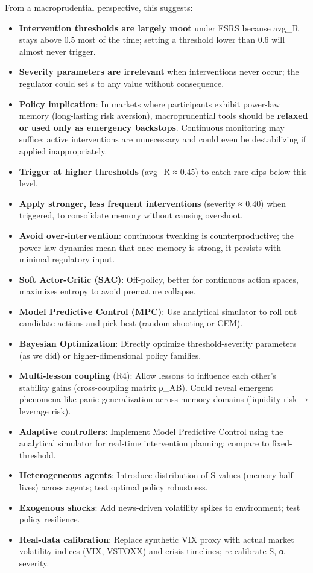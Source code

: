 \documentclass[11pt]{article}
\begin{document}
{{{From a macroprudential perspective, this suggests:
\begin{itemize}
  \item \textbf{Intervention thresholds are largely moot} under FSRS because avg\_R stays above 0.5 most of the time; setting a threshold lower than 0.6 will almost never trigger.
  \item \textbf{Severity parameters are irrelevant} when interventions never occur; the regulator could set s to any value without consequence.
  \item \textbf{Policy implication}: In markets where participants exhibit power-law memory (long-lasting risk aversion), macroprudential tools should be \textbf{relaxed or used only as emergency backstops}. Continuous monitoring may suffice; active interventions are unnecessary and could even be destabilizing if applied inappropriately.
  \item \textbf{Trigger at higher thresholds} (avg\_R ≈ 0.45) to catch rare dips below this level,
  \item \textbf{Apply stronger, less frequent interventions} (severity ≈ 0.40) when triggered, to consolidate memory without causing overshoot,
  \item \textbf{Avoid over-intervention}: continuous tweaking is counterproductive; the power-law dynamics mean that once memory is strong, it persists with minimal regulatory input.
  \item \textbf{Soft Actor-Critic (SAC)}: Off-policy, better for continuous action spaces, maximizes entropy to avoid premature collapse.
  \item \textbf{Model Predictive Control (MPC)}: Use analytical simulator to roll out candidate actions and pick best (random shooting or CEM).
  \item \textbf{Bayesian Optimization}: Directly optimize threshold-severity parameters (as we did) or higher-dimensional policy families.
  \item \textbf{Multi-lesson coupling} (R4): Allow lessons to influence each other's stability gains (cross-coupling matrix ρ\_AB). Could reveal emergent phenomena like panic-generalization across memory domains (liquidity risk → leverage risk).
  \item \textbf{Adaptive controllers}: Implement Model Predictive Control using the analytical simulator for real-time intervention planning; compare to fixed-threshold.
  \item \textbf{Heterogeneous agents}: Introduce distribution of S values (memory half-lives) across agents; test optimal policy robustness.
  \item \textbf{Exogenous shocks}: Add news-driven volatility spikes to environment; test policy resilience.
  \item \textbf{Real-data calibration}: Replace synthetic VIX proxy with actual market volatility indices (VIX, VSTOXX) and crisis timelines; re-calibrate S, α, severity.
\end{itemize}


}}}
\end{document}
